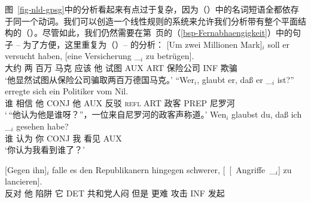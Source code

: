 图~\ref{fig-nld-gpsg}中的分析看起来有点过于复杂，因为（）中的名词短语全都依存于同一个动词。我们可以创造一个线性规则的系统来允许我们分析带有整个平面结构的（）。尽管如此，我们仍然需要在第~\pageref{bsp-Fernabhaengigkeit}页的（\ref{bsp-Fernabhaengigkeit}）中的句子 -- 为了方便，这里重复为（）-- 的分析：
\eal
\ex\label{bsp-um-zwei-millionen-zwei}
\gll {}[Um zwei Millionen Mark]$_i$ soll er versucht haben, [eine Versicherung \_$_i$ zu betrügen].\footnotemark\\
       {}\spacebr{}大约 两 百万 马克 应该 他 试图 AUX \spacebr{}ART 保险公司 {} INF 欺骗\\
\glt `他显然试图从保险公司骗取两百万德国马克。'
\ex
\gll "`Wer$_i$, glaubt er, daß er \_$_i$ ist?"' erregte sich ein Politiker vom Nil.\footnotemark\\
    \spacebr{}谁 相信 他 CONJ 他 {} AUX 反驳 \textsc{refl} ART 政客 PREP 尼罗河\\
\glt `\,“他认为他是谁呀？”，一位来自尼罗河的政客声称道。'
\ex\label{ex-wen-glaubst-du-dass-zwei}
\gll Wen$_i$ glaubst du, daß ich \_$_i$ gesehen habe?\footnotemark\\
     谁 认为 你 CONJ 我 {} 看见 AUX\\
\glt `你认为我看到谁了？'
\ex
{\raggedright
\gll {}[Gegen ihn]$_i$ falle es den Republikanern hingegen schwerer, [~[~Angriffe~\_$_i$] zu lancieren].\footnotemark\\
	 {}\spacebr{}反对 他 陷阱 它 DET 共和党人闷 但是 更难
         \hspaceThis{[~[~}攻击 INF 发起\\
\par}
